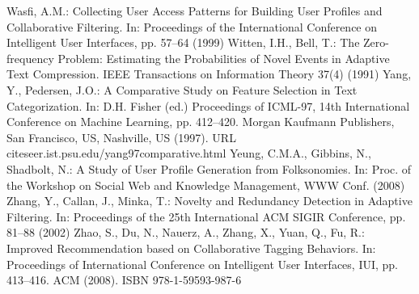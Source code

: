 \begin{thebibliography}{110}
Wasfi, A.M.: Collecting User Access Patterns for Building User Profiles and Collaborative Filtering. In: Proceedings of the International Conference on Intelligent User Interfaces, pp. 57–64 (1999)
Witten, I.H., Bell, T.: The Zero-frequency Problem: Estimating the Probabilities of Novel Events in Adaptive Text Compression. IEEE Transactions on Information Theory 37(4) (1991)
Yang, Y., Pedersen, J.O.: A Comparative Study on Feature Selection in Text Categorization. In: D.H. Fisher (ed.) Proceedings of ICML-97, 14th International Conference on Machine Learning, pp. 412–420. Morgan Kaufmann Publishers, San Francisco, US, Nashville, US (1997). URL citeseer.ist.psu.edu/yang97comparative.html
Yeung, C.M.A., Gibbins, N., Shadbolt, N.: A Study of User Profile Generation from Folksonomies. In: Proc. of the Workshop on Social Web and Knowledge Management, WWW Conf. (2008)
Zhang, Y., Callan, J., Minka, T.: Novelty and Redundancy Detection in Adaptive Filtering. In: Proceedings of the 25th International ACM SIGIR Conference, pp. 81–88 (2002)
Zhao, S., Du, N., Nauerz, A., Zhang, X., Yuan, Q., Fu, R.: Improved Recommendation based on Collaborative Tagging Behaviors. In: Proceedings of International Conference on Intelligent User Interfaces, IUI, pp. 413–416. ACM (2008). ISBN 978-1-59593-987-6
\end{thebibliography}
